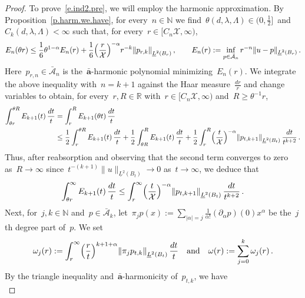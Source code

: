 \documentclass[11pt,twoside]{article} %
\numberwithin{equation}{section}
\theoremstyle{definition}
\let\originalleft\left
\let\originalright\right
\renewcommand{\left}{\mathopen{}\mathclose\bgroup\originalleft}
\renewcommand{\right}{\aftergroup\egroup\originalright}
\newcommand*{\N}{\ensuremath{\mathbb{N}}}
\newcommand*{\R}{\ensuremath{\mathbb{R}}}
\newcommand{\qand}{\quad \mbox{and} \quad }
\renewcommand{\a}{\mathbf{a}}
\newcommand{\ahom}{\bar{\a}}
\newcommand{\X}{\mathcal{X}}
\newcommand{\A}{\mathcal{A}}
\newcommand{\Ahom}{\bar{\A}}
\begin{document}
\begin{proof}
To prove~\eqref{e.ind2.pre}, we will employ the harmonic approximation. 
By Proposition~\ref{p.harm.we.have}, for every~$n \in \N$ we find~$\theta(d,\lambda,\Lambda) \in (0,\tfrac12]$~and~$C_k(d,\lambda,\Lambda)<\infty$ such that, for every~$r \in [ C_n \X,\infty)$, 
\begin{equation*}  
E_{n}(\theta r)
\leq 
\frac16 \theta^{1-\alpha} E_{n}(r) 
+ \frac16  \Bigl( \frac{r}{\X} \Bigr)^{-\alpha} r^{-k} \left\| p_{r,k} \right\|_{\underline{L}^2(B_r)} \, , \qquad  E_{n}(r) := \inf_{p \in \Ahom_n} r^{-n} \| u - p \|_{\underline{L}^2(B_{r})} 
\,.
\end{equation*}
Here~$p_{r,n} \in \Ahom_n$ is the~$\ahom$-harmonic polynomial minimizing~$E_{n}(r)$.
We integrate the above inequality with~$n= k+1$ against the Haar measure~$\frac{dr}{r}$ and change variables to obtain, for every~$r,R \in \R$ with~$r \in [ C_n \X,\infty)$ and~$R \geq \theta^{-1} r$,
\begin{align*} %
\int_{\theta r}^{\theta R} E_{k+1}(t) \, \frac{dt}{t}
&
=
\int_{r}^{R} E_{k+1}(\theta t) \, \frac{dt}{t}
\notag \\ &
\leq 
\frac12 \int_{r}^{\theta R} E_{k+1}(t) \, \frac{dt}{t}
+ 
\frac12 \int_{\theta R}^R E_{k+1}(t) \, \frac{dt}{t}
+ 
\frac12 \int_{r}^{R}  \Bigl( \frac{t}{\X} \Bigr)^{-\alpha} \left\| p_{t,k+1} \right\|_{\underline{L}^2(B_t)} \, \frac{dt}{t^{k+2}}
\,.
\end{align*}
Thus, after reabsorption and observing that the second term converges to zero as~$R \to \infty$ since~$t^{-(k+1)} \| u \|_{\underline{L}^{2}(B_t)} \to 0$ as~$t \to \infty$, we deduce that
\begin{equation} \label{e.Ekplusone.est.pre}
\int_{\theta r}^\infty E_{k+1}(t) \, \frac{dt}{t} 
\leq 
 \int_{r}^\infty  \Bigl( \frac{t}{\X} \Bigr)^{-\alpha} \left\| p_{t,k+1} \right\|_{\underline{L}^2(B_t)} \, \frac{dt}{t^{k+2}}
 \,.
\end{equation}
Next, for~$j,k \in\N$ and~$p \in \Ahom_k$, let~$\pi_j p(x) := \sum_{|\alpha|=j} \frac1{\alpha!}(\partial_{\alpha} p) (0) x^{\alpha}$ be the~$j$th degree part of~$p$. We set
\begin{equation*} %
\omega_j(r):= 
\int_{r}^\infty \Bigl( \frac{r}{t} \Bigr)^{k+1+\alpha} \left\| \pi_j p_{t,k} \right\|_{\underline{L}^2(B_t)} \, \frac{dt}{t} 
\qand 
\omega(r) 
:=
\sum_{j=0}^k 
\omega_j(r)
\,.
\end{equation*}
By the triangle inequality and~$\ahom$-harmonicity of~$p_{t,k}$, we have 
\begin{equation*} %

\end{equation*}
\end{proof}
\end{document}
